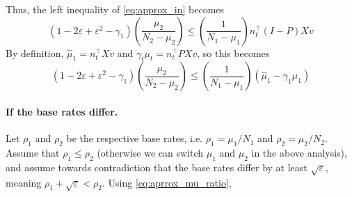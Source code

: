 \documentclass[11pt]{article}
\newcommand{\xhdr}[1]{\vspace{-0.2in} \paragraph*{\bf {#1}.}}
\def\tran{^{\top}}
\newcommand{\p}[1]{\left(#1\right)}
\begin{document}
Thus, the left inequality of \eqref{eq:approx_in} becomes
\begin{equation}
  (1-2\varepsilon + \varepsilon^2 - \gamma_1)\p{\frac{\mu_2}{N_2-\mu_2}} \le
  \p{\frac{1}{N_1-\mu_1}} n_t\tran (I-P)Xv
\end{equation}
By definition, $\hat \mu_1 = n_t\tran Xv$ and $\gamma_t \mu_t = n_t\tran PXv$,
so this becomes
\begin{equation}
  (1-2\varepsilon + \varepsilon^2 - \gamma_1)\p{\frac{\mu_2}{N_2-\mu_2}} \le
  \p{\frac{1}{N_1-\mu_1}} (\hat \mu_1 - \gamma_1 \mu_1)
  \label{eq:aprrox_mu_ratio}
\end{equation}

\xhdr{If the base rates differ}
Let $\rho_1$ and $\rho_2$ be the respective base rates, i.e. $\rho_1 =
\mu_1/N_1$ and $\rho_2 = \mu_2/N_2$. Assume that $\rho_1 \le \rho_2$ (otherwise
we can switch $\mu_1$ and $\mu_2$ in the above analysis), and assume towards
contradiction that the base rates differ by at least $\sqrt{\varepsilon}$,
meaning $\rho_1 + \sqrt{\varepsilon} < \rho_2$. Using
\eqref{eq:aprrox_mu_ratio},
\end{document}
